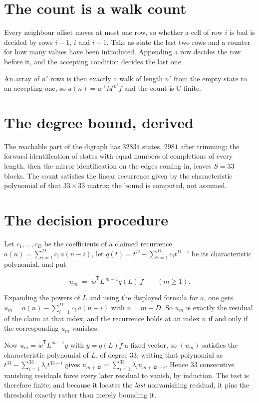 \documentclass[11pt]{article}
\theoremstyle{definition}
\begin{document}
\section{The count is a walk count}

Every neighbour offset moves at most one row, so whether a cell of row $i$ is bad is decided by rows $i-1$, $i$ and $i+1$. Take as state the last two rows and a counter for how many values have been introduced. Appending a row decides the row before it, and the accepting condition decides the last one.

An array of $n'$ rows is then exactly a walk of length $n'$ from the empty state to an accepting one, so $a(n) = w^{\mathsf T}M^{\,n'}f$ and the count is C-finite.

\section{The degree bound, derived}

The reachable part of the digraph has $32834$ states, $2981$ after trimming; the forward identification of states with equal numbers of completions of every length, then the mirror identification on the edges coming in, leaves $S = 33$ blocks. The count satisfies the linear recurrence given by the characteristic polynomial of that $33\times33$ matrix; the bound is computed, not assumed.

\section{The decision procedure}

Let $c_1,\dots,c_D$ be the coefficients of a claimed recurrence $a(n) = \sum_{i=1}^{D} c_i\,a(n-i)$, let $q(t) = t^{D} - \sum_{i=1}^{D} c_i t^{D-i}$ be its characteristic polynomial, and put

\[u_m \;=\; \tilde w^{\mathsf T} L^{\,m-1} q(L)\,\tilde f \qquad (m \ge 1).\]

Expanding the powers of $L$ and using the displayed formula for $a$, one gets $u_m = a(n) - \sum_{i=1}^{D} c_i\,a(n-i)$ with $n = m + D$. So $u_m$ is exactly the residual of the claim at that index, and the recurrence holds at an index $n$ if and only if the corresponding $u_m$ vanishes.

Now $u_m = \tilde w^{\mathsf T} L^{m-1} y$ with $y = q(L)\tilde f$ a fixed vector, so $(u_m)$ satisfies the characteristic polynomial of $L$, of degree $33$: writing that polynomial as $t^{33} - \sum_{i=1}^{33} \lambda_i t^{33-i}$ gives $u_{m+33} = \sum_{i=1}^{33} \lambda_i u_{m+33-i}$. Hence $33$ consecutive vanishing residuals force every later residual to vanish, by induction. The test is therefore finite; and because it locates the {\itshape last} nonvanishing residual, it pins the threshold exactly rather than merely bounding it.
\end{document}
